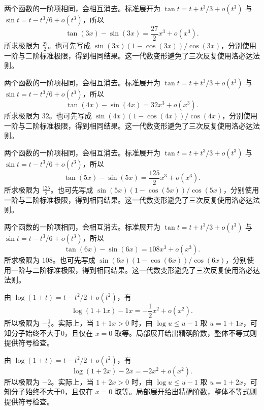 \documentclass[12pt,fontset=fandol]{ctexart}
\begin{document}
\begin{solve}\label{ans:c5q15}
两个函数的一阶项相同，会相互消去。标准展开为 $\tan t=t+t^3/3+o(t^3)$ 与 $\sin t=t-t^3/6+o(t^3)$，所以
\[
\tan(3x)-\sin(3x)=\frac{27}{2}x^3+o(x^3).
\]
所求极限为 $\frac{27}{2}$。也可先写成 $\sin(3x)(1-\cos(3x))/\cos(3x)$，分别使用一阶与二阶标准极限，得到相同结果。这一代数变形避免了三次反复使用洛必达法则。
\end{solve}

\begin{solve}\label{ans:c5q16}
两个函数的一阶项相同，会相互消去。标准展开为 $\tan t=t+t^3/3+o(t^3)$ 与 $\sin t=t-t^3/6+o(t^3)$，所以
\[
\tan(4x)-\sin(4x)=32x^3+o(x^3).
\]
所求极限为 $32$。也可先写成 $\sin(4x)(1-\cos(4x))/\cos(4x)$，分别使用一阶与二阶标准极限，得到相同结果。这一代数变形避免了三次反复使用洛必达法则。
\end{solve}

\begin{solve}\label{ans:c5q17}
两个函数的一阶项相同，会相互消去。标准展开为 $\tan t=t+t^3/3+o(t^3)$ 与 $\sin t=t-t^3/6+o(t^3)$，所以
\[
\tan(5x)-\sin(5x)=\frac{125}{2}x^3+o(x^3).
\]
所求极限为 $\frac{125}{2}$。也可先写成 $\sin(5x)(1-\cos(5x))/\cos(5x)$，分别使用一阶与二阶标准极限，得到相同结果。这一代数变形避免了三次反复使用洛必达法则。
\end{solve}

\begin{solve}\label{ans:c5q18}
两个函数的一阶项相同，会相互消去。标准展开为 $\tan t=t+t^3/3+o(t^3)$ 与 $\sin t=t-t^3/6+o(t^3)$，所以
\[
\tan(6x)-\sin(6x)=108x^3+o(x^3).
\]
所求极限为 $108$。也可先写成 $\sin(6x)(1-\cos(6x))/\cos(6x)$，分别使用一阶与二阶标准极限，得到相同结果。这一代数变形避免了三次反复使用洛必达法则。
\end{solve}

\begin{solve}\label{ans:c5q19}
由 $\log(1+t)=t-t^2/2+o(t^2)$，有
\[
\log(1+1x)-1x=-\frac{1}{2}x^2+o(x^2).
\]
所以极限为 $-\frac{1}{2}$。实际上，当 $1+1x>0$ 时，由 $\log u\le u-1$ 取 $u=1+1x$，可知分子始终不大于0，且仅在 $x=0$ 取等。局部展开给出精确阶数，整体不等式则提供符号检查。
\end{solve}

\begin{solve}\label{ans:c5q20}
由 $\log(1+t)=t-t^2/2+o(t^2)$，有
\[
\log(1+2x)-2x=-2x^2+o(x^2).
\]
所以极限为 $-2$。实际上，当 $1+2x>0$ 时，由 $\log u\le u-1$ 取 $u=1+2x$，可知分子始终不大于0，且仅在 $x=0$ 取等。局部展开给出精确阶数，整体不等式则提供符号检查。
\end{solve}
\end{document}
